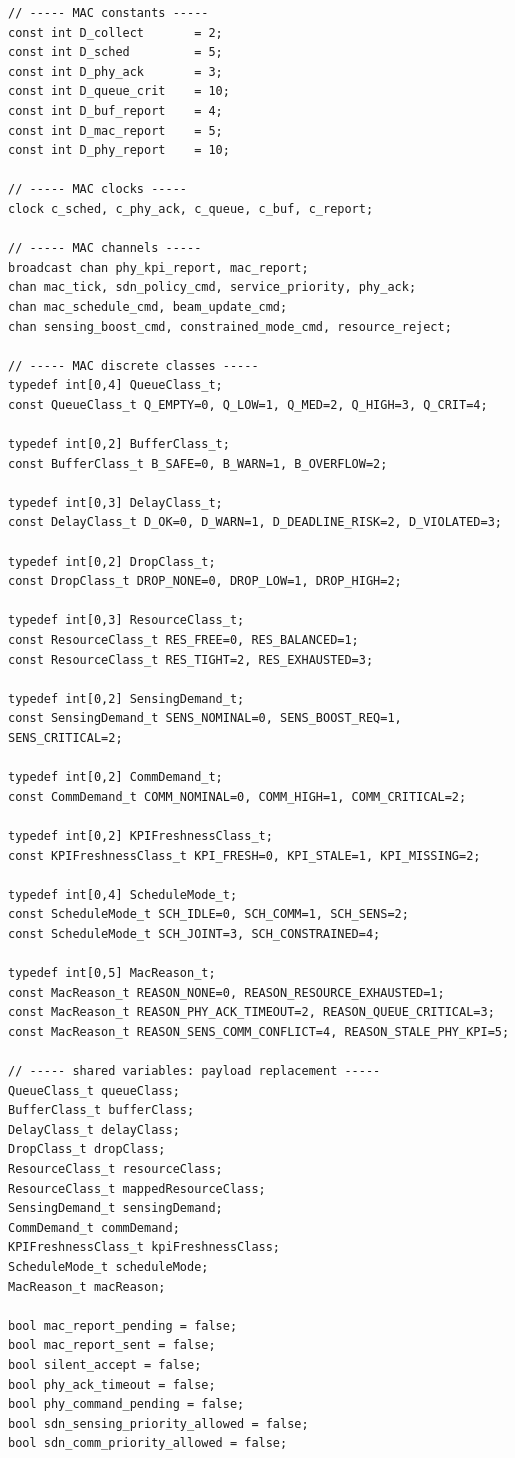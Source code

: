 \documentclass[10pt,a4paper]{article}
\begin{document}
\begin{verbatim}
// ----- MAC constants -----
const int D_collect       = 2;
const int D_sched         = 5;
const int D_phy_ack       = 3;
const int D_queue_crit    = 10;
const int D_buf_report    = 4;
const int D_mac_report    = 5;
const int D_phy_report    = 10;

// ----- MAC clocks -----
clock c_sched, c_phy_ack, c_queue, c_buf, c_report;

// ----- MAC channels -----
broadcast chan phy_kpi_report, mac_report;
chan mac_tick, sdn_policy_cmd, service_priority, phy_ack;
chan mac_schedule_cmd, beam_update_cmd;
chan sensing_boost_cmd, constrained_mode_cmd, resource_reject;

// ----- MAC discrete classes -----
typedef int[0,4] QueueClass_t;
const QueueClass_t Q_EMPTY=0, Q_LOW=1, Q_MED=2, Q_HIGH=3, Q_CRIT=4;

typedef int[0,2] BufferClass_t;
const BufferClass_t B_SAFE=0, B_WARN=1, B_OVERFLOW=2;

typedef int[0,3] DelayClass_t;
const DelayClass_t D_OK=0, D_WARN=1, D_DEADLINE_RISK=2, D_VIOLATED=3;

typedef int[0,2] DropClass_t;
const DropClass_t DROP_NONE=0, DROP_LOW=1, DROP_HIGH=2;

typedef int[0,3] ResourceClass_t;
const ResourceClass_t RES_FREE=0, RES_BALANCED=1;
const ResourceClass_t RES_TIGHT=2, RES_EXHAUSTED=3;

typedef int[0,2] SensingDemand_t;
const SensingDemand_t SENS_NOMINAL=0, SENS_BOOST_REQ=1, SENS_CRITICAL=2;

typedef int[0,2] CommDemand_t;
const CommDemand_t COMM_NOMINAL=0, COMM_HIGH=1, COMM_CRITICAL=2;

typedef int[0,2] KPIFreshnessClass_t;
const KPIFreshnessClass_t KPI_FRESH=0, KPI_STALE=1, KPI_MISSING=2;

typedef int[0,4] ScheduleMode_t;
const ScheduleMode_t SCH_IDLE=0, SCH_COMM=1, SCH_SENS=2;
const ScheduleMode_t SCH_JOINT=3, SCH_CONSTRAINED=4;

typedef int[0,5] MacReason_t;
const MacReason_t REASON_NONE=0, REASON_RESOURCE_EXHAUSTED=1;
const MacReason_t REASON_PHY_ACK_TIMEOUT=2, REASON_QUEUE_CRITICAL=3;
const MacReason_t REASON_SENS_COMM_CONFLICT=4, REASON_STALE_PHY_KPI=5;

// ----- shared variables: payload replacement -----
QueueClass_t queueClass;
BufferClass_t bufferClass;
DelayClass_t delayClass;
DropClass_t dropClass;
ResourceClass_t resourceClass;
ResourceClass_t mappedResourceClass;
SensingDemand_t sensingDemand;
CommDemand_t commDemand;
KPIFreshnessClass_t kpiFreshnessClass;
ScheduleMode_t scheduleMode;
MacReason_t macReason;

bool mac_report_pending = false;
bool mac_report_sent = false;
bool silent_accept = false;
bool phy_ack_timeout = false;
bool phy_command_pending = false;
bool sdn_sensing_priority_allowed = false;
bool sdn_comm_priority_allowed = false;
\end{verbatim}
\end{document}
